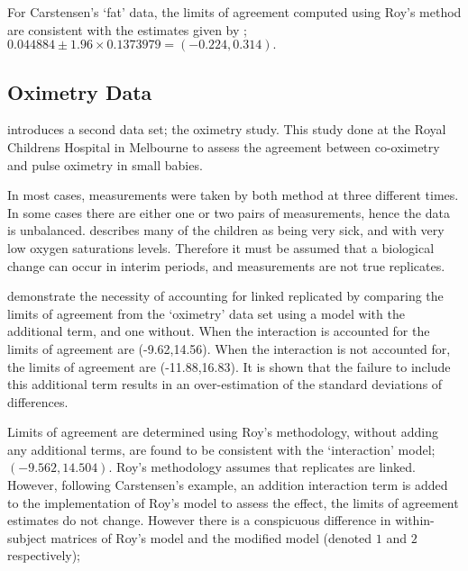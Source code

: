 \documentclass[12pt, a4paper]{report}
\theoremstyle{plain}
\theoremstyle{definition}
\theoremstyle{remark}
\begin{document}
	For Carstensen's `fat' data, the limits of agreement computed using Roy's
	method are consistent with the estimates given by \citet{BXC2008}; $0.044884  \pm 1.96 \times  0.1373979 = (-0.224,  0.314).$
	
	
	\subsection{Oximetry Data}
		\citet{BXC2008} introduces a second data set; the oximetry study. This study done at the Royal Childrens Hospital in
		Melbourne to assess the agreement between co-oximetry and pulse oximetry in small babies.
		
		In most cases, measurements were taken by both method at three different times. In some cases there are either one or two pairs of measurements, hence the data is unbalanced. \citet{BXC2008} describes many of the children as being very sick, and with very low oxygen saturations levels. Therefore it must be assumed that a biological change can occur in interim periods, and measurements are not true replicates.
		
		\citet{BXC2008} demonstrate the necessity of accounting for linked replicated by comparing the limits of agreement from the `oximetry' data set using a model with the additional term, and one without. When the interaction is accounted for the limits of agreement are (-9.62,14.56). When the interaction is not accounted for, the limits of agreement are (-11.88,16.83). It is shown that the failure to include this additional term results in an over-estimation of the standard deviations of differences.
		
		Limits of agreement are determined using Roy's methodology, without adding any additional terms, are found to be consistent with the `interaction' model; $(-9.562, 14.504 )$. Roy's methodology assumes that replicates are linked. However, following Carstensen's example, an addition interaction term is added to the implementation of Roy's model to assess the effect, the limits of agreement estimates do not change. However there is a conspicuous difference in within-subject matrices of Roy's model and the modified model (denoted $1$ and $2$ respectively);
		
\end{document}
